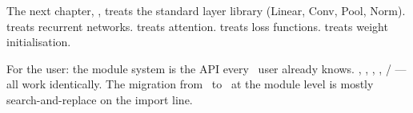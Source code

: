 The next chapter, , treats the
standard layer library (Linear, Conv, Pool, Norm).
 treats recurrent networks.
 treats attention.  treats
loss functions.  treats weight
initialisation.

\begin{lucidnote}
For the user: the module system is the API every \
user already knows. , ,
, ,  /
 --- all work identically. The migration from
\ to \Lucid\ at the module level is mostly
search-and-replace on the import line.
\end{lucidnote}
